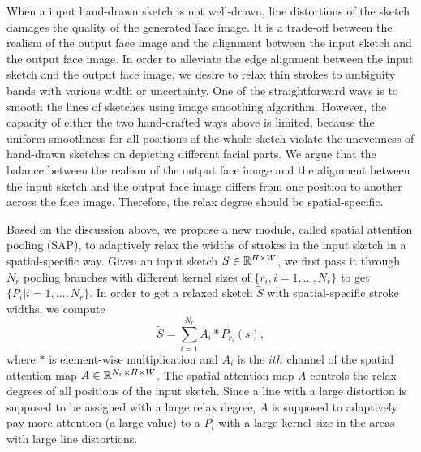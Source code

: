

When a input hand-drawn sketch is not well-drawn, line distortions of the sketch damages the quality of the generated face image. It is a trade-off between the realism of the output face image and the alignment between the input sketch and the output face image.
%
In order to alleviate the edge alignment between the input sketch and the output face image, we desire to relax thin strokes to ambiguity bands with various width or uncertainty.
One of the straightforward ways is to smooth the lines of sketches using image smoothing algorithm. 
%
However, the capacity of either the two hand-crafted ways above is limited, because the uniform smoothness  for all positions of the whole sketch violate the unevenness of hand-drawn sketches on depicting different facial parts. 
%
We argue that the balance between the realism of the output face image and the alignment between the input sketch and the output face image differs from one position to another across the face image. Therefore, the relax degree should be spatial-specific. 

Based on the discussion above, we propose a new module, called spatial attention pooling (SAP), to adaptively relax the widths of strokes in the input sketch in a spatial-specific way. 
Given an input sketch $S\in {\mathbb{R}}^{H\times W}$, we first pass it through $N_r$ pooling branches with different kernel sizes of $\{r_i, i=1,\ldots, N_r\}$ to get $\{P_{i}| i=1,\ldots,N_r\}$. 
In order to get a relaxed sketch $\tilde{S}$ with spatial-specific stroke widths, we compute
%	
\begin{equation}
\tilde{S}=\sum_{i=1}^{N_r} A_i * P_{r_i}(s),
\end{equation}
%
where $*$ is element-wise multiplication and $A_i$ is the $ith$ channel of the spatial attention map $A\in {\mathbb{R}}^{N_r\times H\times W}$.
The spatial attention map $A$ controls the relax degrees of all positions of the input sketch.
Since a line with a large distortion is supposed to be assigned with a large relax degree, $A$ is supposed to adaptively pay more attention (a large value) to a $P_i$ with a large kernel size in the areas with large line distortions.
%

